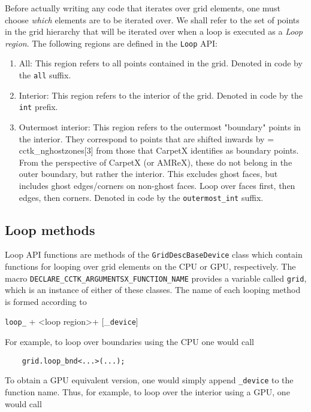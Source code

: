 Before actually writing any code that iterates over grid elements, one must choose \textit{which} elements are to be iterated over. We shall refer to the set of points in the grid hierarchy that will be iterated over when a loop is executed as a \textit{Loop region}. The following regions are defined in the \texttt{Loop} API:

\begin{enumerate}
    \item All: This region refers to all points contained in the grid. Denoted in code by the \texttt{all} suffix.
    
    \item Interior: This region refers to the interior of the grid. Denoted in code by the \texttt{int} prefix.
    
    \item Outermost interior: This region refers to the outermost "boundary" points in the interior. They correspond to points that are shifted inwards by = cctk\_nghostzones[3] from those that CarpetX identifies as boundary points. From the perspective of CarpetX (or AMReX), these do not belong in the outer boundary, but rather the interior. This excludes ghost faces, but includes ghost edges/corners on non-ghost faces. Loop over faces first, then edges, then corners. Denoted in code by the \texttt{outermost\_int} suffix.
\end{enumerate}


\subsection{Loop methods}
\label{sec:loop_methods}

Loop API functions are methods of the \texttt{GridDescBaseDevice} class which contain functions for looping over grid elements on the CPU or GPU, respectively. The macro \texttt{DECLARE\_CCTK\_ARGUMENTSX\_FUNCTION\_NAME} provides a variable called \texttt{grid}, which is an instance of either of these classes. The name of each looping method is formed according to
%
\begin{center}
    \texttt{loop\_} + \textless loop region\textgreater + [\_\texttt{device}]
\end{center}

For example, to loop over boundaries using the CPU one would call
%
\begin{lstlisting}
    grid.loop_bnd<...>(...);
\end{lstlisting}
%
To obtain a GPU equivalent version, one would simply append \texttt{\_device} to the function name. Thus, for example, to loop over the interior using a GPU, one would call 

